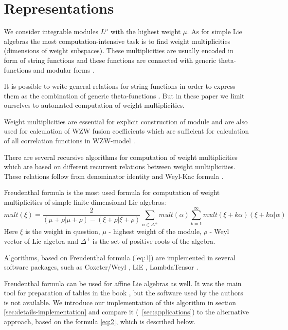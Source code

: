\documentclass[a4paper,12pt]{article}
\theoremstyle{definition} \newtheorem{Def}{Definition}
\begin{document}
\section{Representations}
\label{sec:representations}

We consider integrable modules $L^{\mu}$ with the highest weight
$\mu$. As for simple Lie algebras the most computation-intensive task
is to find weight multiplicities (dimensions of weight subspaces). 
These multiplicities are usually encoded in form of string functions
and these functions are connected with generic theta-functions and
modular forms \cite{kac1990idl}. 

It is possible to write general relations for string functions in order to express them as the combination of generic theta-functions \cite{Lyakhovsky-Unwritten-String-equations-with-fans}. But in these paper we limit ourselves to automated computation of weight multiplicities. 

Weight multiplicities are essential for explicit construction of
module and are also used for calculation of WZW fusion coefficients
which are sufficient for calculation of all correlation functions in
WZW-model \cite{Walton:1999xc}.

There are several recursive algorithms for computation of weight
multiplicities which are based on different recurrent relations
between weight multiplicities. These relations follow from denominator
identity and Weyl-Kac formula \cite{kac1990idl,wakimoto2001idl}. 

Freudenthal formula is the most used formula for computation of weight
multiplicities of simple finite-dimensional Lie algebras:
\begin{equation}
  \label{eq:1}
   mult(\xi)=\frac{2}{(\mu+\rho|\mu+\rho)-(\xi+\rho|\xi+\rho)}\sum_{\alpha\in\Delta^{+}} mult(\alpha) \sum_{k=1}^{\infty}mult(\xi+k\alpha)(\xi+k\alpha|\alpha)
\end{equation}
Here $\xi$ is the weight in question, $\mu$ - highest weight of the
module, $\rho$ - Weyl vector of Lie algebra and $\Delta^{+}$ is the
set of positive roots of the algebra.

Algorithms, based on Freudenthal formula (\ref{eq:1}) are implemented
in several software packages, such as Coxeter/Weyl
\cite{stembridge1995mps}, LiE \cite{vanleeuwen1994lsp}, LambdaTensor
\cite{fischbacher2002ilp}.

Freudenthal formula can be used for affine Lie algebras as well. It was
the main tool for preparation of tables in the book
\cite{kass1990ala}, but the software used by the authors is not
available. We introduce our implementation of this algorithm in
section \ref{sec:details-implementation} and compare it
(~\ref{sec:applications}) to the alternative
approach, based on the formula \eqref{eq:2}, which is described below.  
\end{document}
